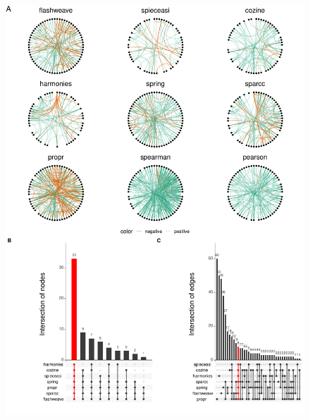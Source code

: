 \documentclass[letterpaper,12pt]{article}
\providecommand{\DIFdelend}{} %
\providecommand{\DIFaddbeginFL}{} %
\providecommand{\DIFaddendFL}{} %
\providecommand{\DIFdelbeginFL}{} %
\providecommand{\DIFdelendFL}{} %
\newcommand{\DIFscaledelfig}{0.5}
\newlength{\DIFdelgraphicswidth} %
\newlength{\DIFdelgraphicsheight} %
\newcommand{\DIFaddincludegraphics}[2][]{{\color{blue}\fbox{\DIFOincludegraphics[#1]{#2}}}} %
\newcommand{\DIFdelincludegraphics}[2][]{%
\sbox{\DIFdelgraphicsbox}{\DIFOincludegraphics[#1]{#2}}%
\settoboxwidth{\DIFdelgraphicswidth}{\DIFdelgraphicsbox} %
\settoboxtotalheight{\DIFdelgraphicsheight}{\DIFdelgraphicsbox} %
\scalebox{\DIFscaledelfig}{%
\parbox[b]{\DIFdelgraphicswidth}{\usebox{\DIFdelgraphicsbox}\\[-\baselineskip] \rule{\DIFdelgraphicswidth}{0em}}\llap{\resizebox{\DIFdelgraphicswidth}{\DIFdelgraphicsheight}{%
\setlength{\unitlength}{\DIFdelgraphicswidth}%
\begin{picture}(1,1)%
\thicklines\linethickness{2pt} %
{\color[rgb]{1,0,0}\put(0,0){\framebox(1,1){}}}%
{\color[rgb]{1,0,0}\put(0,0){\line( 1,1){1}}}%
{\color[rgb]{1,0,0}\put(0,1){\line(1,-1){1}}}%
\end{picture}%
}\hspace*{3pt}}} %
} %
\DeclareRobustCommand{\DIFdelend}{\DIFOaddend \let\includegraphics\DIFOincludegraphics} %
\DeclareRobustCommand{\DIFaddbeginFL}{\DIFOaddbeginFL \let\includegraphics\DIFaddincludegraphics} %
\DeclareRobustCommand{\DIFaddendFL}{\DIFOaddendFL \let\includegraphics\DIFOincludegraphics} %
\DeclareRobustCommand{\DIFdelbeginFL}{\DIFOdelbeginFL \let\includegraphics\DIFdelincludegraphics} %
\DeclareRobustCommand{\DIFdelendFL}{\DIFOaddendFL \let\includegraphics\DIFOincludegraphics} %
\begin{document}
\DIFdelend \begin{figure}[H]
    \centering
    \DIFdelbeginFL %
\DIFdelendFL \DIFaddbeginFL \includegraphics[width=\textwidth]{figure4.pdf}
  \DIFaddendFL \end{figure}
\end{document}
